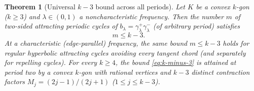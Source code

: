 \documentclass[11pt,reqno]{amsart}
\newtheorem{theorem}{Theorem}[section]
\theoremstyle{definition}
\theoremstyle{remark}
\begin{document}
\begin{theorem}[Universal $k-3$ bound across all periods]\label{thm:k-minus-3}
Let $K$ be a convex $k$-gon ($k \ge 3$) and $\lambda \in (0,1)$ a noncharacteristic frequency. Then the number $m$ of two-sided attracting periodic cycles of $b_\lambda = \gamma_\lambda^+\gamma_\lambda^-$ (of arbitrary period) satisfies
\begin{equation}\label{eq:k-minus-3}
  m \le k - 3.
\end{equation}
At a characteristic (edge-parallel) frequency, the same bound $m \le k-3$ holds for regular hyperbolic \emph{attracting} cycles avoiding every tangent chord (and separately for repelling cycles). For every $k \ge 4$, the bound \eqref{eq:k-minus-3} is attained at period two by a convex $k$-gon with rational vertices and $k-3$ distinct contraction factors $M_j = (2j-1)/(2j+1)$ ($1 \le j \le k-3$).
\end{theorem}
\end{document}
